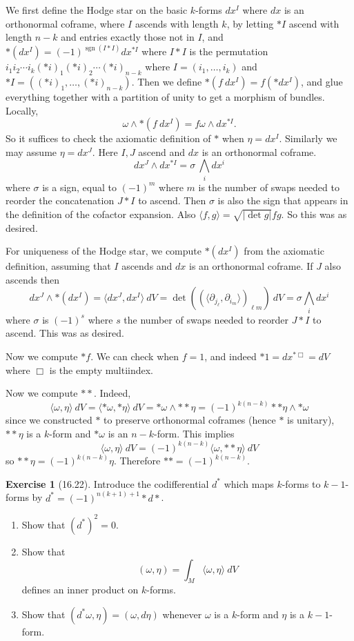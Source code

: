 \documentclass[10pt]{article}
\newcommand{\sgn}{\operatorname{sgn}}
\theoremstyle{definition}
\newtheorem{exer}{Exercise}
\begin{document}
We first define the Hodge star on the basic $k$-forms $dx^I$ where $dx$ is an orthonormal coframe, where $I$ ascends with length $k$, by letting $*I$ ascend with length $n-k$ and entries exactly those not in $I$, and $*(dx^I) = (-1)^{\sgn(I*I)} dx^{*I}$ where $I*I$ is the permutation $i_1i_2 \cdots i_k (*i)_1 (*i)_2 \cdots (*i)_{n-k}$ where $I = (i_1, \dots, i_k)$ and $*I = ((*i)_1, \dots, (*i)_{n-k})$.
Then we define $*(f~dx^I) = f(*dx^I)$, and glue everything together with a partition of unity to get a morphism of bundles.
Locally,
$$\omega \wedge *(f~dx^I) = f\omega \wedge dx^{*I}.$$
So it suffices to check the axiomatic definition of $*$ when $\eta = dx^I$.
Similarly we may assume $\eta = dx^J$. Here $I,J$ ascend and $dx$ is an orthonormal coframe.
$$dx^J \wedge dx^{*I} = \sigma ~\bigwedge_i dx^i$$
where $\sigma$ is a sign, equal to $(-1)^m$ where $m$ is the number of swaps needed to reorder the concatenation $J*I$ to ascend.
Then $\sigma$ is also the sign that appears in the definition of the cofactor expansion. Also $\langle f, g\rangle = \sqrt{|\det g|}fg$. So this was as desired.

For uniqueness of the Hodge star, we compute $*(dx^I)$ from the axiomatic definition, assuming that $I$ ascends and $dx$ is an orthonormal coframe.
If $J$ also ascends then
$$dx^J \wedge *(dx^I) = \langle dx^J, dx^I\rangle ~dV = \det((\langle \partial_{j_\ell}, \partial_{i_m}\rangle)_{\ell m}) ~dV = \sigma \bigwedge_i dx^i$$
where $\sigma$ is $(-1)^s$ where $s$ the number of swaps needed to reorder $J*I$ to ascend. This was as desired.

Now we compute $*f$. We can check when $f = 1$, and indeed $*1 = dx^{*\Box} = dV$ where $\Box$ is the empty multiindex.

Now we compute $**$. Indeed,
$$\langle \omega, \eta\rangle~dV = \langle *\omega, *\eta\rangle~dV = *\omega \wedge **\eta = (-1)^{k(n-k)} **\eta \wedge *\omega$$
since we constructed $*$ to preserve orthonormal coframes (hence $*$ is unitary), $**\eta$ is a $k$-form and $*\omega$ is an $n-k$-form.
This implies
$$\langle \omega, \eta\rangle~dV = (-1)^{k(n-k)}\langle \omega, **\eta\rangle ~dV$$
so $**\eta = (-1)^{k(n-k)}\eta$. Therefore $** = (-1)^{k(n-k)}$.

\begin{exer}[16.22]
Introduce the codifferential $d^*$ which maps $k$-forms to $k-1$-forms by $d^* = (-1)^{n(k+1)+1}*d*$.
\begin{enumerate}
\item Show that $(d^*)^2 = 0$.
\item Show that
$$(\omega, \eta) = \int_M \langle \omega, \eta\rangle ~dV$$
defines an inner product on $k$-forms.
\item Show that $(d^*\omega, \eta) = (\omega, d\eta)$ whenever $\omega$ is a $k$-form and $\eta$ is a $k-1$-form.
\end{enumerate}
\end{exer}
\end{document}
